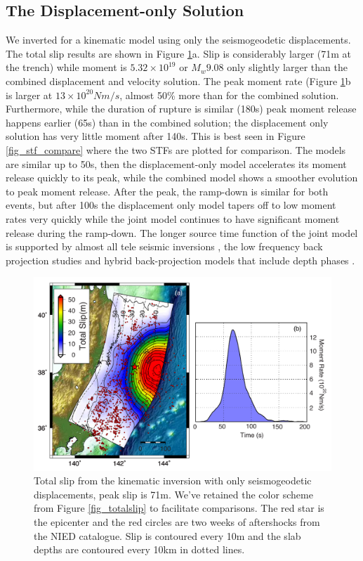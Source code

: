 \subsection{The Displacement-only Solution}

We inverted for a kinematic model using only the seismogeodetic displacements. The total slip results are shown in Figure \ref{fig_total_disponly}a. Slip is considerably larger (71m at the trench) while moment is $5.32\times10^{19}$ or $M_w9.08$ only slightly larger than the combined displacement and velocity solution. The peak moment rate (Figure \ref{fig_total_disponly}b is larger at $13\times10^{20} Nm/s$, almost 50\% more than for the combined solution. Furthermore, while the duration of rupture is similar (180s) peak moment release happens earlier (65s) than in the combined solution; the displacement only solution has very little moment after 140s. This is best seen in Figure \ref{fig_stf_compare} where the two STFs are plotted for comparison. The models are similar up to 50s, then the displacement-only model accelerates its moment release quickly to its peak, while the combined model shows a smoother evolution to peak moment release. After the peak, the ramp-down is similar for both events, but after 100s the displacement only model tapers off to low moment rates very quickly while the joint model continues to have significant moment release during the ramp-down. The longer source time function of the joint model is supported by almost all tele seismic inversions \citep{shao2011}, the low frequency back projection studies \citep{kiser2012} and hybrid back-projection models that include depth phases \citep{yagi2012}.


\begin{figure}[!ht] 
  \centering
  \includegraphics[width=0.9\linewidth]{./figures/ch4/total_slip_moment_rate_disp_only.pdf}
    \caption[Total slip with seismogeodetic displacements only]{Total slip from the kinematic inversion with only seismogeodetic displacements, peak slip is 71m. We've retained the color scheme from Figure \ref{fig_totalslip} to facilitate comparisons. The red star is the epicenter and the red circles are two weeks of aftershocks from the NIED catalogue. Slip is contoured every 10m and the slab depths are contoured every 10km in dotted lines. }
  \label{fig_total_disponly}
\end{figure}

